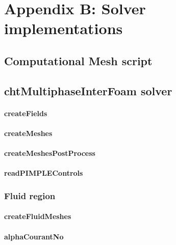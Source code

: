 
\chapter{Appendix B: Solver implementations} %

\label{AppendixB} 
\section{Computational Mesh script}
\label{mesh script}

\section{chtMultiphaseInterFoam solver}
\label{chtMultiphaseInterFoam}

\subsubsection*{createFields}

\subsubsection*{createMeshes}

\subsubsection*{createMeshesPostProcess}

\subsubsection*{readPIMPLEControls}

\subsection{Fluid region}
\subsubsection*{createFluidMeshes}

\subsubsection*{alphaCourantNo}

